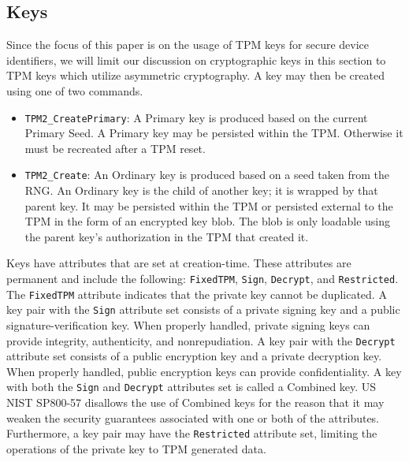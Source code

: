 \subsection{Keys}


Since the focus of this paper is on the usage of TPM keys for secure device identifiers, we will limit our discussion on cryptographic keys in this section to TPM keys which utilize asymmetric cryptography.  A key may then be created using one of two commands.
\begin{itemize}
  \item \verb|TPM2_CreatePrimary|: A Primary key is produced based on the current Primary Seed. A Primary key may be persisted within the TPM. Otherwise it must be recreated after a TPM reset.
  \item \verb|TPM2_Create|: An Ordinary key is produced based on a seed taken from the RNG. An Ordinary key is the child of another key; it is wrapped by that parent key. It may be persisted within the TPM or persisted external to the TPM in the form of an encrypted key blob. The blob is only loadable using the parent key's authorization in the TPM that created it.
\end{itemize}
Keys have attributes that are set at creation-time. These attributes are permanent and include the following: \verb|FixedTPM|, \verb|Sign|, \verb|Decrypt|, and \verb|Restricted|. The \verb|FixedTPM| attribute indicates that the private key cannot be duplicated. A key pair with the \verb|Sign| attribute set consists of a private signing key and a public signature-verification key. When properly handled, private signing keys can provide integrity, authenticity, and nonrepudiation. A key pair with the \verb|Decrypt| attribute set consists of a public encryption key and a private decryption key. When properly handled, public encryption keys can provide confidentiality. A key with both the \verb|Sign| and \verb|Decrypt| attributes set is called a Combined key. US NIST SP800-57 disallows the use of Combined keys for the reason that it may weaken the security guarantees associated with one or both of the attributes. Furthermore, a key pair may have the \verb|Restricted| attribute set, limiting the operations of the private key to TPM generated data.

